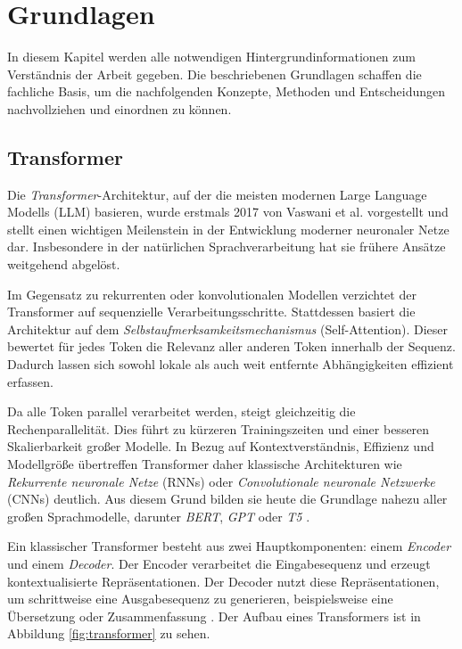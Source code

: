 \chapter{Grundlagen}
In diesem Kapitel werden alle notwendigen Hintergrundinformationen zum Verständnis der Arbeit gegeben. Die beschriebenen Grundlagen schaffen die fachliche Basis, um die nachfolgenden Konzepte, Methoden und Entscheidungen nachvollziehen und einordnen zu können.

\section{Transformer}
Die \textit{Transformer}-Architektur, auf der die meisten modernen Large Language Modells (LLM) basieren, wurde erstmals 2017 von Vaswani et al. \cite{Vaswani2017} vorgestellt und stellt einen wichtigen Meilenstein in der Entwicklung moderner neuronaler Netze dar. Insbesondere in der natürlichen Sprachverarbeitung hat sie frühere Ansätze weitgehend abgelöst.

Im Gegensatz zu rekurrenten oder konvolutionalen Modellen verzichtet der Transformer auf sequenzielle Verarbeitungsschritte. Stattdessen basiert die Architektur auf dem \textit{Selbstaufmerksamkeitsmechanismus} (Self-Attention). Dieser bewertet für jedes Token die Relevanz aller anderen Token innerhalb der Sequenz. Dadurch lassen sich sowohl lokale als auch weit entfernte Abhängigkeiten effizient erfassen.

Da alle Token parallel verarbeitet werden, steigt gleichzeitig die Rechenparallelität. Dies führt zu kürzeren Trainingszeiten und einer besseren Skalierbarkeit großer Modelle. In Bezug auf Kontextverständnis, Effizienz und Modellgröße übertreffen Transformer daher klassische Architekturen wie  \textit{Rekurrente neuronale Netze} (RNNs) oder \textit{Convolutionale neuronale Netzwerke} (CNNs) deutlich. Aus diesem Grund bilden sie heute die Grundlage nahezu aller großen Sprachmodelle, darunter \textit{BERT}, \textit{GPT} oder \textit{T5} \cite{Islam2023}\cite{Lin2021}.

\newpage
Ein klassischer Transformer besteht aus zwei Hauptkomponenten: einem \textit{Encoder} und einem \textit{Decoder}. Der Encoder verarbeitet die Eingabesequenz und erzeugt kontextualisierte Repräsentationen. Der Decoder nutzt diese Repräsentationen, um schrittweise eine Ausgabesequenz zu generieren, beispielsweise eine Übersetzung oder Zusammenfassung \cite{Vaswani2017}. Der Aufbau eines Transformers ist in Abbildung \ref{fig:transformer} zu sehen.

